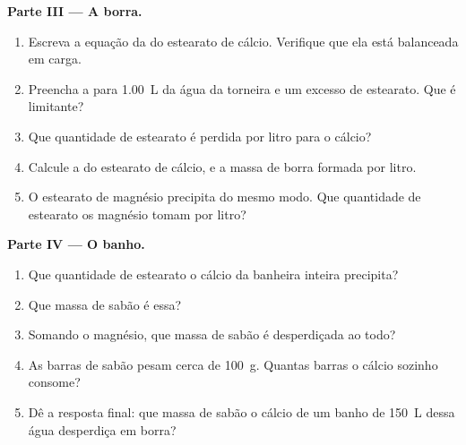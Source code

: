 \begin{problem}
\medskip
\noindent\textbf{Parte III --- A borra.}
\begin{enumerate}[resume]
  \item Escreva a equação da  do estearato de cálcio.
        Verifique que ela está balanceada em carga.
  \item Preencha a  para \qty{1.00}{L} da água da
        torneira e um excesso de  estearato. Que  é
        limitante?
  \item Que quantidade de  estearato é perdida por litro para o
        cálcio?
  \item Calcule a  do estearato de cálcio, e a massa de borra
        formada por litro.
  \item O estearato de magnésio precipita do mesmo modo. Que quantidade
        de estearato os  magnésio tomam por litro?
\end{enumerate}

\medskip
\noindent\textbf{Parte IV --- O banho.}
\begin{enumerate}[resume]
  \item Que quantidade de  estearato o cálcio da banheira inteira
        precipita?
  \item Que massa de sabão é essa?
  \item Somando o magnésio, que massa de sabão é desperdiçada ao todo?
  \item As barras de sabão pesam cerca de \qty{100}{g}. Quantas barras
        o cálcio sozinho consome?
  \item Dê a resposta final: que massa de sabão o cálcio de um banho de
        \qty{150}{L} dessa água desperdiça em borra?
\end{enumerate}
\end{problem}